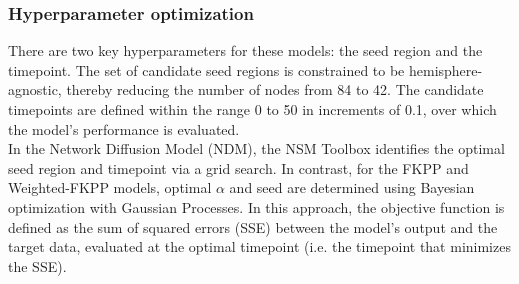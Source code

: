\subsubsection{Hyperparameter optimization}
There are two key hyperparameters for these models: the seed region and the timepoint. The set of candidate seed regions is constrained to be hemisphere-agnostic, thereby reducing the number of nodes from 84 to 42. The candidate timepoints are defined within the range 0 to 50 in increments of 0.1, over which the model's performance is evaluated.\\ 

In the Network Diffusion Model (NDM), the NSM Toolbox identifies the optimal seed region and timepoint via a grid search. In contrast, for the FKPP and Weighted-FKPP models, optimal $\alpha$ and seed are determined using Bayesian optimization with Gaussian Processes. In this approach, the objective function is defined as the sum of squared errors (SSE) between the model's output and the target data, evaluated at the optimal timepoint (i.e. the timepoint that minimizes the SSE).

